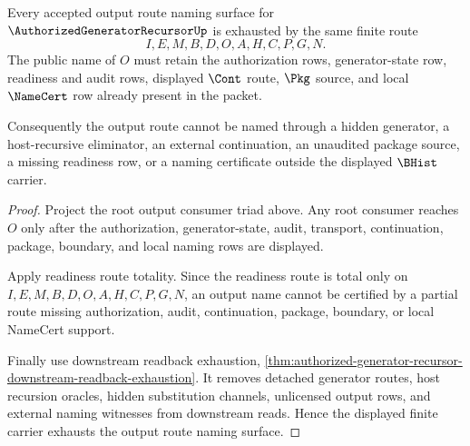 \begin{theorem}
\label{thm:authorized-generator-recursor-output-route-naming-exhaustion}
Every accepted output route naming surface for
$\AuthorizedGeneratorRecursorUp$ is exhausted by the same finite route
$$
I,E,M,B,D,O,A,H,C,P,G,N.
$$
The public name of $O$ must retain the authorization rows, generator-state
row, readiness and audit rows, displayed $\Cont$ route, $\Pkg$ source, and
local $\NameCert$ row already present in the packet.

Consequently the output route cannot be named through a hidden generator, a
host-recursive eliminator, an external continuation, an unaudited package
source, a missing readiness row, or a naming certificate outside the displayed
$\BHist$ carrier.
\end{theorem}
\begin{proof}
Project the root output consumer triad above. Any root consumer reaches $O$
only after the authorization, generator-state, audit, transport,
continuation, package, boundary, and local naming rows are displayed.

Apply readiness route totality. Since the readiness route is total only on
$I,E,M,B,D,O,A,H,C,P,G,N$, an output name cannot be certified by a partial
route missing authorization, audit, continuation, package, boundary, or local
NameCert support.

Finally use downstream readback exhaustion,
\autoref{thm:authorized-generator-recursor-downstream-readback-exhaustion}.
It removes detached generator routes, host recursion oracles, hidden
substitution channels, unlicensed output rows, and external naming witnesses
from downstream reads. Hence the displayed finite carrier exhausts the output
route naming surface.
\end{proof}

